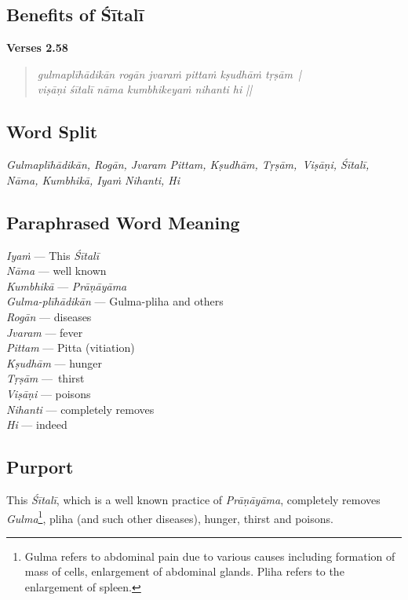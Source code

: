 \subsection*{Benefits of Śītalī}

\noindent \textbf{Verses 2.58}

\begin{verse}
\textit{gulmaplīhādikān rogān jvaraṁ pittaṁ kṣudhāṁ tṛṣām |\\
viṣāṇi śītalī nāma kumbhikeyaṁ nihanti hi ||}
\end{verse}

\subsection*{Word Split}


\textit{Gulmaplīhādikān, Rogān, Jvaram Pittam, Kṣudhām, Tṛṣām, Viṣāṇi, Śītalī, Nāma, Kumbhikā, Iyaṁ Nihanti, Hi}

\subsection*{Paraphrased Word Meaning}


\begin{multicols}{2}
\textit{Iyaṁ} --- This \textit{Śītalī} \\
\textit{Nāma} --- well known \\
\textit{Kumbhikā} --- \textit{Prāṇāyāma}\\
\textit{Gulma-plīhādikān} --- Gulma-pliha and others \\
\textit{Rogān} --- diseases \\
\textit{Jvaram} --- fever\\
\textit{Pittam} --- Pitta (vitiation)\\
\textit{Kṣudhām} --- hunger \\
\textit{Tṛṣām} --- thirst \\
\textit{Viṣāṇi} --- poisons\\
\textit{Nihanti} --- completely removes\\
\textit{Hi} --- indeed
\end{multicols}

\subsection*{Purport}


This \textit{Śītalī}, which is a well known practice of \textit{Prāṇāyāma}, completely removes \textit{Gulma}\footnote{Gulma refers to abdominal pain due to various causes including formation of mass of cells, enlargement of abdominal glands. Pliha refers to the enlargement of spleen.}, pliha (and such other diseases), hunger, thirst and poisons.

